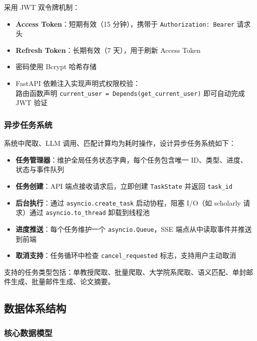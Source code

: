 \documentclass[11pt]{article}
\begin{document}
采用 JWT 双令牌机制：

\begin{itemize}
    \item \textbf{Access Token}：短期有效（15 分钟），携带于 \texttt{Authorization: Bearer} 请求头
    \item \textbf{Refresh Token}：长期有效（7 天），用于刷新 Access Token
    \item 密码使用 Bcrypt 哈希存储
    \item FastAPI 依赖注入实现声明式权限校验：\\
    路由函数声明 \texttt{current\_user = Depends(get\_current\_user)} 即可自动完成 JWT 验证
\end{itemize}

\subsubsection{异步任务系统}

系统中爬取、LLM 调用、匹配计算均为耗时操作，设计异步任务系统如下：

\begin{itemize}
    \item \textbf{任务管理器}：维护全局任务状态字典，每个任务包含唯一 ID、类型、进度、状态与事件队列
    \item \textbf{任务创建}：API 端点接收请求后，立即创建 \texttt{TaskState} 并返回 \texttt{task\_id}
    \item \textbf{后台执行}：通过 \texttt{asyncio.create\_task} 启动协程，阻塞 I/O（如 scholarly 请求）通过 \texttt{asyncio.to\_thread} 卸载到线程池
    \item \textbf{进度推送}：每个任务维护一个 \texttt{asyncio.Queue}，SSE 端点从中读取事件并推送到前端
    \item \textbf{取消支持}：任务循环中检查 \texttt{cancel\_requested} 标志，支持用户主动取消
\end{itemize}

支持的任务类型包括：单教授爬取、批量爬取、大学院系爬取、语义匹配、单封邮件生成、批量邮件生成、论文摘要。

\subsection{数据体系结构}

\subsubsection{核心数据模型}
\end{document}
